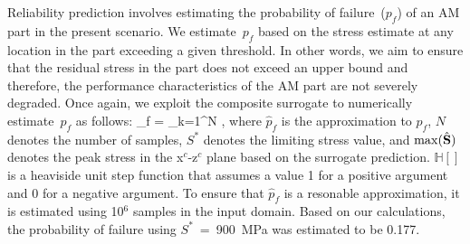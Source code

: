 Reliability prediction involves estimating the probability of failure~($p_f$) of an AM part
in the present scenario. We estimate~$p_f$ based on the stress estimate at any location in
the part exceeding a given threshold. In other words, we aim to ensure that the residual stress
in the part does not exceed an upper bound and therefore, the performance characteristics of
the AM part are not severely degraded. Once again, we exploit the composite surrogate to
numerically estimate~$p_f$ as follows:
%
\be
{}_f = \sum\limits_{k=1}^{N} ,
\ee
\label{eq:pf}
%
where $\hat{p}_f$ is the approximation to $p_f$, $N$ denotes the number of samples, $S^\ast$
denotes the limiting stress value, and $\max(\hat{\mathbf{{S}}})$ denotes the peak stress in the
x$^c$-z$^c$ plane based on the surrogate prediction. $\mathbb{H}[]$
is a heaviside unit step function that assumes a value 1 for a positive argument and 0 for
a negative argument.
To ensure that $\hat{p}_f$ is a resonable approximation, it is estimated
using 10$^6$ samples in the input domain. Based on our calculations, the probability of 
failure using $S^\ast$~=~900~MPa was estimated to be 0.177. 


















































 
